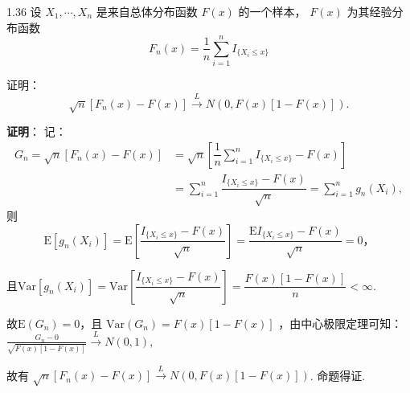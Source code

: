 \begin{example}
    1.36  设 $X_1,\cdots,X_n$ 是来自总体分布函数 $F(x)$ 的一个样本， $F(x)$ 为其经验分布函数 
    \[
        F_{n}(x)=\dfrac{1}{n}\sum \limits _{i=1}^{n}I_{\{X_i \leqslant x\}}
    \]
    
    证明： 
    \[
        \sqrt{n}[F_{n}(x)-F(x)] \xrightarrow{L} N(0,F(x)[1-F(x)]).
    \]

    \textbf{证明}：
    记： 
    \[
        \begin{aligned} G_n=\sqrt{n}[F_{n}(x)-F(x)]&=\sqrt{n}\left[\dfrac{1}{n}\sum \limits _{i=1}^{n}I_{\{X_i \leqslant x\}}-F(x)\right] \\ &=\sum \limits _{i=1}^{n}\dfrac{I_{\{X_i \leq x\}}-F(x)}{\sqrt{n}}=\sum \limits _{i=1}^{n} g_n(X_i),\end{aligned}
    \]
    则 
    \[
        \text{E}[g_n(X_i)]=\text{E}\left[\dfrac{I_{\{X_i \leqslant x\}}-F(x)}{\sqrt{n}}\right]=\dfrac{\text{E}I_{\{X_i \leqslant x\}}-F(x)}{\sqrt{n}}=0 ，
    \]

    且$\text{Var}[g_n(X_i)]=\text{Var}\left[\dfrac{I_{\{X_i \leqslant x\}}-F(x)}{\sqrt{n}}\right]=\dfrac{F(x)[1-F(x)]}{n}<\infty .$

    故$ \text{E}(G_n)=0 $，且 $\text{Var}(G_n)=F(x)[1-F(x)]$ ，由中心极限定理可知： $\frac{G_n-0}{\sqrt{F(x)[1-F(x)]}} \xrightarrow{L} N(0,1)$, 
    
    故有 $\sqrt{n}[F_{n}(x)-F(x)] \xrightarrow{L} N(0,F(x)[1-F(x)]) $. 命题得证.
\end{example}
